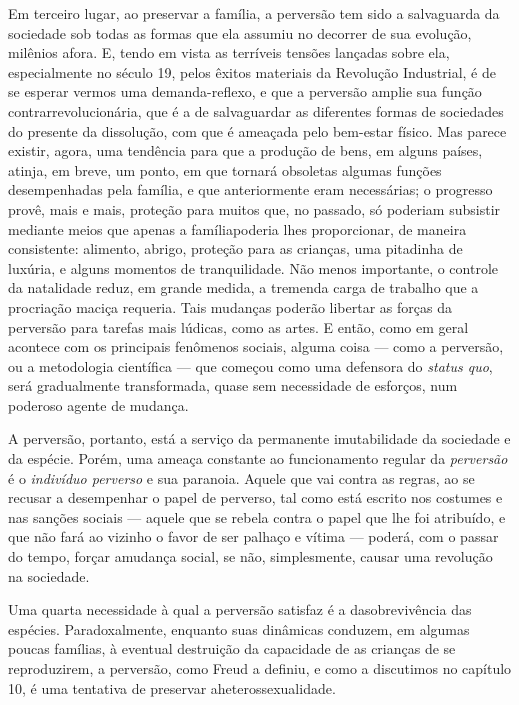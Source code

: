 Em terceiro lugar, ao preservar a família, a perversão tem sido a
salvaguarda da sociedade sob todas as formas que ela assumiu no
decorrer de sua evolução, milênios afora. E, tendo em vista as
terríveis tensões lançadas sobre ela, especialmente no século 19, pelos
êxitos materiais da Revolução Industrial, é de se esperar vermos uma
demanda-reflexo, e que a perversão amplie sua função
contrarrevolucionária, que é a de salvaguardar as diferentes formas de
sociedades do presente da dissolução, com que é ameaçada pelo bem-estar
físico. Mas parece existir, agora, uma tendência para que a produção de
bens, em alguns países, atinja, em breve, um ponto, em que tornará
obsoletas algumas funções desempenhadas pela família, e que
anteriormente eram necessárias; o progresso provê, mais e mais,
proteção para muitos que, no passado, só poderiam subsistir mediante
meios que apenas a família\idxinflu[|)] poderia lhes proporcionar, de maneira
consistente: alimento, abrigo, proteção para as crianças, uma pitadinha
de luxúria, e alguns momentos de tranquilidade. Não menos importante, o
controle da natalidade\idxcontr{} reduz, em grande medida, a tremenda carga de
trabalho que a procriação maciça requeria. Tais mudanças poderão
libertar as forças da perversão para tarefas mais lúdicas, como as
artes.\idxcria{} E então, como em geral acontece com os principais fenômenos
sociais, alguma coisa --- como a perversão, ou a metodologia
científica --- que começou como uma defensora do \textit{status quo},
será gradualmente transformada, quase sem necessidade de esforços, num
poderoso agente de mudança.

A perversão, portanto, está a serviço da permanente imutabilidade da
sociedade e da espécie. Porém, uma ameaça constante ao funcionamento
regular da \textit{perversão} é o \textit{indivíduo perverso} e sua
paranoia. Aquele que vai contra as regras, ao se recusar a desempenhar
o papel de perverso, tal como está escrito nos costumes e nas sanções
sociais --- aquele que se rebela contra o papel que lhe foi atribuído,
e que não fará ao vizinho o favor de ser palhaço e vítima --- poderá,
com o passar do tempo, forçar a\idxheteroconf[|)] mudança social, se não, simplesmente,
causar uma revolução na sociedade.

Uma quarta necessidade à qual a perversão satisfaz é a da\idxpervsobre[|(]
sobrevivência das espécies. Paradoxalmente, enquanto suas dinâmicas
conduzem, em algumas poucas famílias, à eventual destruição da
capacidade de as crianças de se reproduzirem, a perversão, como Freud\idxfreudperve{} a
definiu, e como a discutimos no capítulo 10, é uma tentativa de
preservar a\idxhetero[|(] heterossexualidade.

